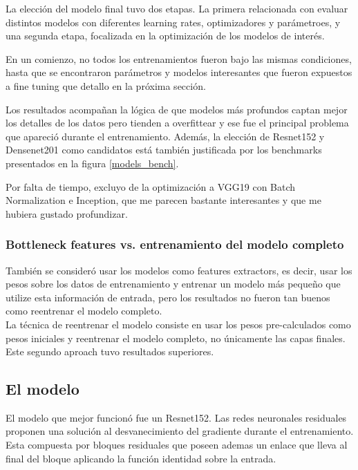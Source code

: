 \documentclass{article}[9pt]
\begin{document}
La elección del modelo final tuvo dos etapas. La primera relacionada con evaluar distintos modelos con diferentes learning rates, optimizadores y parámetroes, y una segunda etapa, focalizada en la optimización de los modelos de interés.
 
En un comienzo, no todos los entrenamientos fueron bajo las mismas condiciones, hasta que se encontraron parámetros y modelos interesantes que fueron expuestos a fine tuning que detallo en la próxima sección.

Los resultados acompañan la lógica de que modelos más profundos captan mejor los detalles de los datos pero tienden a overfittear y ese fue el principal problema que apareció durante el entrenamiento. Además, la elección de Resnet152 y Densenet201 como candidatos está también justificada por los benchmarks presentados en la figura \ref{models_bench}.

Por falta de tiempo, excluyo de la optimización a VGG19 con Batch Normalization e Inception, que me parecen bastante interesantes y que me hubiera gustado profundizar. 

\subsubsection{Bottleneck features vs. entrenamiento del modelo completo}

También se consideró usar los modelos como features extractors, es decir, usar los pesos sobre los datos de entrenamiento y entrenar un modelo más pequeño que utilize esta información de entrada, pero los resultados no fueron tan buenos como reentrenar el modelo completo.\\

La técnica de reentrenar el modelo consiste en usar los pesos pre-calculados como pesos iniciales y reentrenar el modelo completo, no únicamente las capas finales. Este segundo aproach tuvo resultados superiores.

\subsection{El modelo}

El modelo que mejor funcionó fue un Resnet152. Las redes neuronales residuales proponen una solución al desvanecimiento del gradiente durante el entrenamiento. Esta compuesta por bloques residuales que poseen ademas un enlace que lleva al final del bloque aplicando la función identidad sobre la entrada. 
\end{document}
